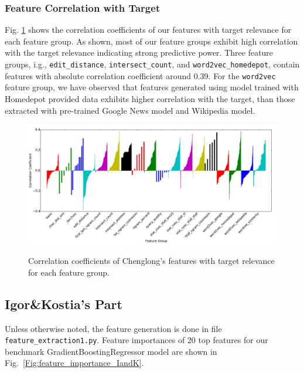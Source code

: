 \documentclass[12pt]{article}
\begin{document}
{{\subsubsection{Feature Correlation with Target}
Fig. \ref{Fig:feature_corr_Chenglong} shows the correlation coefficients of our features with target relevance for each feature group. As shown, most of our feature groups exhibit high correlation with the target relevance indicating strong predictive power. Three feature groups, i.g., \texttt{edit\_distance}, \texttt{intersect\_count}, and \texttt{word2vec\_homedepot}, contain features with absolute correlation coefficient around 0.39. For the \texttt{word2vec} feature group, we have observed that features generated using model trained with Homedepot provided data exhibits higher correlation with the target, than those extracted with pre-trained Google News model and Wikipedia model.

\begin{figure}[t]
  \centering
  \includegraphics[width=1\textwidth]{../Fig/feature_corr_Chenglong.pdf}\\
  \caption{Correlation coefficients of Chenglong's features with target relevance for each feature group.}
  \label{Fig:feature_corr_Chenglong}
\end{figure}

\subsection{Igor\&Kostia's Part}
\label{subsec:Features_IandK}
Unless otherwise noted, the feature generation is done in file \texttt{feature\_extraction1.py}. Feature importances of 20 top features for our benchmark GradientBoostingRegressor model are shown in Fig.\ \ref{Fig:feature_importance_IandK}.

}}
\end{document}
